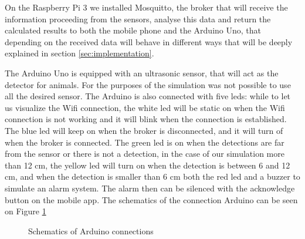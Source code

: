 \documentclass[12pt]{article}
\begin{document}
On the Raspberry Pi 3 we installed Mosquitto, the broker that will receive the information proceeding from the sensors, analyse this data and return the calculated results to both the mobile phone and the Arduino Uno, that depending on the received data will behave in different ways that will be deeply explained in section \ref{sec:implementation}.

The Arduino Uno is equipped with an ultrasonic sensor, that will act as the detector for animals. For the purposes of the simulation was not possible to use all the desired sensor. The Arduino is also connected with five leds: while to let us visualize the Wifi connection, the white led will be static on when the Wifi connection is not working and it will blink when the connection is established. The blue led will keep on when the broker is disconnected, and it will turn of when the broker is connected. The green led is on when the detections are far from the sensor or there is not a detection, in the case of our simulation more than 12 cm, the yellow led will turn on when the detection is between 6 and 12 cm, and when the detection is smaller than 6 cm both the red led and a buzzer to simulate an alarm system. The alarm then can be silenced with the acknowledge button on the mobile app. The schematics of the connection Arduino can be seen on Figure \ref{fig::ard}

\begin{figure}[!h]
\caption{Schematics of Arduino connections}
\label{fig::ard}
\end{figure}
\end{document}
